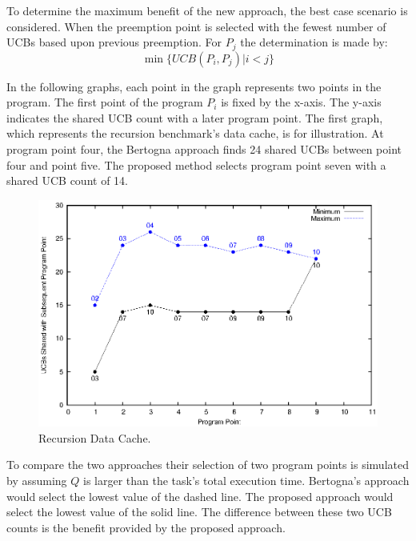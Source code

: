 To determine the maximum benefit of the new approach, the best case
scenario is considered. When the preemption point is selected with the
fewest number of UCBs based upon previous preemption.  For ${P_j}$ the
determination is made by:
\begin{equation*}
  \min\{ UCB(P_i, P_j) \vert i < j \}
\end{equation*}

In the following graphs, each point in the graph represents two points
in the program. The first point of the program ${P_i}$ is fixed by the
x-axis. The y-axis indicates the shared UCB count with a later program
point. The first graph, which represents the recursion benchmark's
data cache, is for illustration. At program point four, the Bertogna
approach finds 24 shared UCBs between point four and point five. The
proposed method selects program point seven with a shared UCB count of
14.
%
\begin{figure}[h!]
\vspace{-10pt}
\begin{center}
\includegraphics[width=\linewidth]{eps/recursion-dcache.eps}
\caption{Recursion Data Cache.}
\label{fig:recusion_data_cache}
\end{center}
\vspace{-10pt}
\end{figure}
To compare the two approaches their selection of two program points is
simulated by assuming ${Q}$ is larger than the task's total execution
time. Bertogna's approach would select the lowest value of the
dashed line. The proposed approach would select the lowest value of
the solid line. The difference between these two UCB counts is the
benefit provided by the proposed approach.
